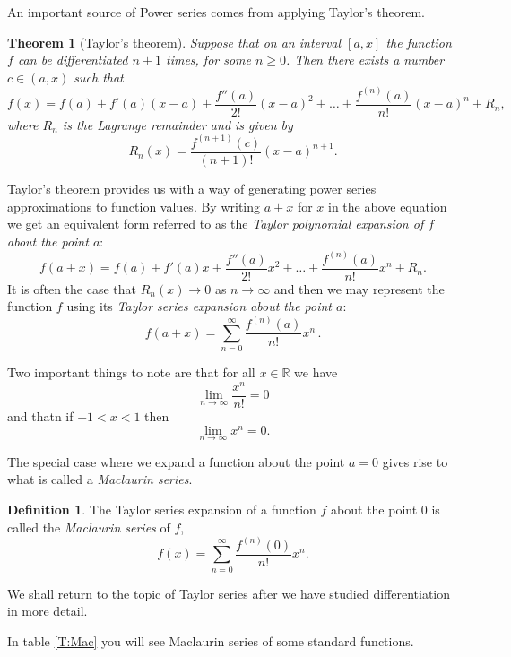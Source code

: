 \documentclass[extrafontsizes, twoside, a4paper]{memoir}
\theoremstyle{plain}%
\newtheorem{thm}{Theorem}[chapter]
\theoremstyle{definition}
\newtheorem{defn}{Definition}[chapter]
\theoremstyle{remark}
\begin{document}
An important source of Power series comes from applying Taylor's theorem.

\begin{thm}[Taylor's theorem]
Suppose that on an interval $[a,x]$ the function $f$ can be differentiated $n+1$ times, for some $n\geq 0$. Then there exists a number $c \in (a,x)$ such that
$$ f(x)=f(a) + f'(a) (x-a) + \frac{f''(a)}{2!} (x-a)^2 + \dots + \frac{f^{(n)}(a)}{n!} (x-a)^n + R_n ,$$
where $R_n$ is the \emph{Lagrange remainder} and is given by
$$ R_n(x) = \frac{f^{(n+1)}(c)}{(n+1)!} (x-a)^{n+1}.$$
\end{thm}

Taylor's theorem provides us with a way of generating power series approximations to function values. By writing $a+x$ for $x$ in the above equation we get an equivalent form referred to as the \emph{Taylor polynomial expansion of $f$ about the point $a$}:
$$ f(a+x)=f(a) + f'(a) x + \frac{f''(a)}{2!} x^2 + \dots + \frac{f^{(n)}(a)}{n!} x^n + R_n .$$
It is often the case that $R_n(x) \to 0$ as $n \to \infty$ and then we may represent the function $f$ using its \emph{Taylor series expansion about the point $a$}:
$$ f(a+x) = \sum_{n=0}^\infty \frac{f^{(n)} (a)}{n!} x^n \, . $$

Two important things to note are that for all $x \in \mathbb{R}$ we have
$$\lim_{n \to \infty} \frac{x^n}{n!} = 0$$
and thatn if $-1<x<1$ then
$$\lim_{n \to \infty} x^n = 0 .$$

The special case where we expand a function about the point $a=0$ gives rise to what is called a \emph{Maclaurin series}.
\begin{defn}
The Taylor series expansion of a function $f$ about the point $0$ is called the \emph{Maclaurin series} of $f$,
$$ f(x) = \sum_{n=0}^\infty \frac{f^{(n)}(0)}{n!} x^n .$$
\end{defn}
We shall return to the topic of Taylor series after we have studied differentiation in more detail.

In table \ref{T:Mac} you will see Maclaurin series of some standard functions.
\end{document}
